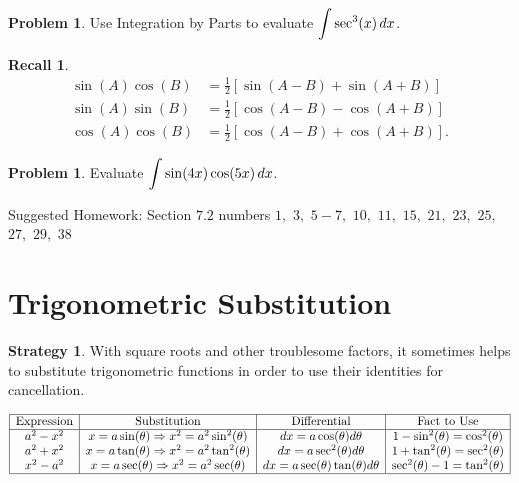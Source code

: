 \documentclass[letterpaper, twoside, 12pt]{book}
\theoremstyle{definition}
\newtheorem{recall}[theorem]{Recall}
\theoremstyle{definition}
\newtheorem{problem}[theorem]{Problem}
\newtheorem{strategy}[theorem]{Strategy}
\newcommand{\ds}{\ensuremath{\displaystyle}}
\begin{document}
\vfill

\newpage

\begin{problem}
 Use Integration by Parts to evaluate $\ds \int \sec^3(x) \, dx$.
\end{problem}

\vfill

\begin{recall}
$$\begin{array}{rl}
    \sin(A)\cos(B) &= \frac{1}{2} \left[\sin\left(A - B\right) + \sin\left(A + B\right)\right] \\
    \sin(A)\sin(B) &= \frac{1}{2} \left[\cos\left(A - B\right) - \cos\left(A + B\right)\right] \\
    \cos(A)\cos(B) &= \frac{1}{2} \left[\cos\left(A - B\right) + \cos\left(A + B\right)\right].
  \end{array}$$
\end{recall}

\begin{problem}
 Evaluate $\ds \int \sin(4x)\cos(5x) \, dx$.
\end{problem}

\vfill

\noindent Suggested Homework: Section $7.2$ numbers $1,$ $3,$ $5 - 7,$ $10,$ $11,$ $15,$ $21,$ $23,$ $25,$ $27,$ $29,$ $38$

\newpage

\section{Trigonometric Substitution}

\begin{strategy}

With square roots and other troublesome factors, it sometimes helps to
substitute trigonometric functions in order to use their identities for
cancellation.

$$\begin{array}{|c|c|c|c|}
   \hline
   \mbox{Expression} & \mbox{Substitution} &
   \mbox{Differential} & \mbox{Fact to Use} \\
   \hline

     a^2-x^2 &
     x=a\sin(\theta) \Rightarrow x^2 = a^2\sin^2(\theta) &
     dx=a\cos(\theta)d\theta &
     1-\sin^2(\theta) = \cos^2(\theta) \\

     a^2+x^2 &
     x=a\tan(\theta) \Rightarrow x^2 = a^2\tan^2(\theta) &
     dx=a\sec^2(\theta)d\theta &
     1+\tan^2(\theta) = \sec^2(\theta) \\

     x^2-a^2 &
     x=a\sec(\theta) \Rightarrow x^2 = a^2\sec(\theta) &
     dx=a\sec(\theta)\tan(\theta)d\theta &
     \sec^2(\theta)-1 = \tan^2(\theta) \\
   \hline
  \end{array}$$

\end{strategy}
\end{document}
